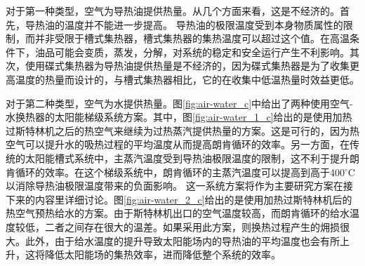 对于第一种类型，空气为导热油提供热量。从几个方面来看，这是不经济的。首先，导热油的温度并不能进一步提高。 导热油的极限温度受到本身物质属性的限制，而并非受限于槽式集热器，槽式集热器的集热温度可以超过这个值。在高温条件下，油品可能会变质，蒸发，分解，对系统的稳定和安全运行产生不利影响。其次，使用碟式集热器为导热油提供热量是不经济的，因为碟式集热器是为了收集更高温度的热量而设计的，与槽式集热器相比，它的在收集中低温热量时效益更低。

对于第二种类型，空气为水提供热量。图\ref{fig:air-water_c}中给出了两种使用空气-水换热器的太阳能梯级系统方案。其中，图\ref{fig:air-water_1_c}给出的是使用加热过斯特林机之后的热空气来继续为过热蒸汽提供热量的方案。这是可行的，因为热空气可以提升水的吸热过程的平均温度从而提高朗肯循环的效率。另一方面，在传统的太阳能槽式系统中，主蒸汽温度受到导热油极限温度的限制，这不利于提升朗肯循环的效率。在这个梯级系统中，朗肯循环的主蒸汽温度可以提高到高于400$\mathrm{^\circ C}$以消除导热油极限温度带来的负面影响。
这一系统方案将作为主要研究方案在接下来的内容里详细讨论。图\ref{fig:air-water_2_c}给出的是使用加热过斯特林机后的热空气预热给水的方案。由于斯特林机出口的空气温度较高，而朗肯循环的给水温度较低，二者之间存在很大的温差。如果采用此方案，则换热过程产生的㶲损很大。此外，由于给水温度的提升导致太阳能场内的导热油的平均温度也会有所上升，这将降低太阳能场的集热效率，进而降低整个系统的效率。
 
